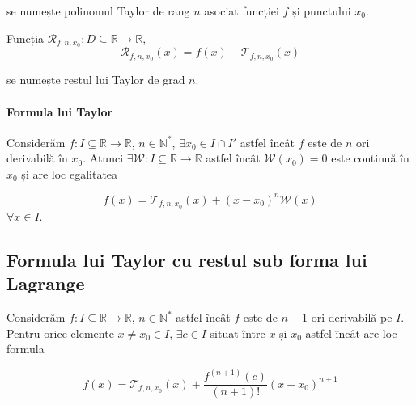 se numește polinomul Taylor de rang $n$ asociat funcției $f$ și punctului $x_{0}$.

\indent Funcția $\mathcal{R}_{f, n, x_{0}}: D \subseteq \mathbb{R} \rightarrow \mathbb{R}$,
\begin{equation*}
\mathcal{R}_{f, n, x_{0}}(x) = f(x) - \mathcal{T}_{f, n, x_{0}}(x)
\end{equation*}

se numește restul lui Taylor de grad $n$.

\paragraph{Formula lui Taylor}
Considerăm $f: I \subseteq \mathbb{R} \rightarrow \mathbb{R}$, $n \in \mathbb{N}^{*}$, $\exists x_{0} \in I \cap I'$ astfel încât $f$ este de $n$ ori derivabilă în $x_{0}$.
Atunci $\exists \mathcal{W}:I \subseteq \mathbb{R} \rightarrow \mathbb{R}$ astfel încât $\mathcal{W}(x_{0}) = 0$ este continuă în $x_{0}$ și are loc egalitatea

\begin{equation*}
f(x) = \mathcal{T}_{f, n, x_{0}}(x) + (x - x_{0})^{n} \mathcal{W}(x)
\end{equation*}
$\forall x \in I$.

\subsection{Formula lui Taylor cu restul sub forma lui Lagrange}
Considerăm $f:I \subseteq \mathbb{R} \rightarrow \mathbb{R}$, $n \in \mathbb{N}^{*}$ astfel încât $f$ este de $n+1$ ori derivabilă pe $I$. Pentru orice elemente
$x \neq x_{0} \in I$, $\exists c \in I$ situat între $x$ și $x_{0}$ astfel încât are loc formula

\begin{equation*}
f(x) = \mathcal{T}_{f, n, x_{0}}(x) + \displaystyle\frac{f^{(n+1)}(c)}{(n+1)!}(x - x_{0})^{n+1}
\end{equation*}
\pagebreak

